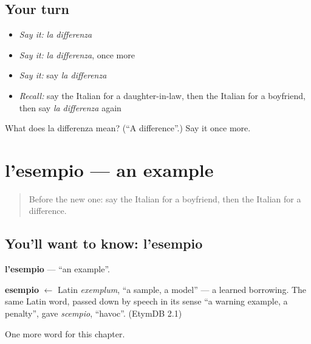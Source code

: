 \subsection*{Your turn}
\begin{itemize}
\raggedright
  \item \emph{Say it:} \emph{la differenza}
  \item \emph{Say it:} \emph{la differenza}, once more
  \item \emph{Say it:} say \emph{la differenza}
  \item \emph{Recall:} say the Italian for a daughter-in-law, then the Italian for a boyfriend, then say \emph{la differenza} again
\end{itemize}

\begin{tcolorbox}[breakable,colback=teal!4,colframe=teal!35!black,title={Before you move on}]
What does la differenza mean? (\textquotedblleft{}A difference\textquotedblright{}.) Say it once more.
\end{tcolorbox}
\section[l'esempio]{l'esempio — an example}

\label{lesson:IT-C252-esempio}



\begin{quote}
Before the new one: say the Italian for a boyfriend, then the Italian for a difference.
\end{quote}

\subsection*{You'll want to know: l'esempio}
\textbf{l'esempio} — \textquotedblleft{}an example\textquotedblright{}.

\begin{cousinweb}
\textbf{esempio} $\leftarrow$ Latin \emph{exemplum}, \textquotedblleft{}a sample, a model\textquotedblright{} — a learned borrowing. The same Latin word, passed down by speech in its sense \textquotedblleft{}a warning example, a penalty\textquotedblright{}, gave \emph{scempio}, \textquotedblleft{}havoc\textquotedblright{}. (EtymDB 2.1)
\end{cousinweb}

\begin{grammarlens}[title={What you've built}]
One more word for this chapter.
\end{grammarlens}

